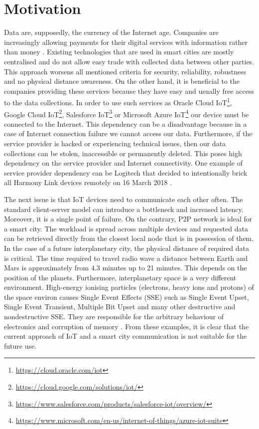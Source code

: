 \section{Motivation}
\quad Data are, supposedly, the currency of the Internet age. Companies are increasingly allowing payments for their digital services with information rather than money \cite{curtis_how_2015}. Existing technologies that are used in smart cities are mostly centralised and do not allow easy trade with collected data between other parties. This approach worsens all mentioned criteria for security, reliability, robustness and no physical distance awareness. On the other hand, it is beneficial to the companies providing these services because they have easy and usually free access to the data collections. In order to use such services as Oracle Cloud IoT\footnote{\url{https://cloud.oracle.com/iot}}, Google Cloud IoT\footnote{\url{https://cloud.google.com/solutions/iot/}}, Salesforce IoT\footnote{\url{https://www.salesforce.com/products/salesforce-iot/overview/}} or Microsoft Azure IoT\footnote{\url{https://www.microsoft.com/en-us/internet-of-things/azure-iot-suite}} our device must be connected to the Internet. This dependency can be a disadvantage because in a case of Internet connection failure we cannot access our data. Furthermore, if the service provider is hacked or experiencing technical issues, then our data collections can be stolen, inaccessible or permanently deleted. This poses high dependency on the service provider and Internet connectivity. One example of service provider dependency can be Logitech that decided to intentionally brick all Harmony Link devices remotely on 16 March 2018 \cite{noauthor_logitech_nodate}.
\vspace{\baselineskip}

The next issue is that IoT devices need to communicate each other often. The standard client-server model can introduce a bottleneck and increased latency. Moreover, it is a single point of failure. On the contrary, P2P network is ideal for a smart city. The workload is spread across multiple devices and requested data can be retrieved directly from the closest local node that is in possession of them. In the case of a future interplanetary city, the physical distance of required data is critical. The time required to travel radio wave a distance between Earth and Mars is approximately from 4.3 minutes up to 21 minutes. This depends on the position of the planets. Furthermore, interplanetary space is a very different environment. High-energy ionising particles (electrons, heavy ions and protons) of the space environ causes Single Event Effects (SSE) such as Single Event Upset, Single Event Transient, Multiple Bit Upset and many other destructive and nondestructive SSE. They are responsible for the arbitrary behaviour of electronics and corruption of memory \cite{duzellier_radiation_2005}. From these examples, it is clear that the current approach of IoT and a smart city communication is not suitable for the future use.
\vspace{\baselineskip}

